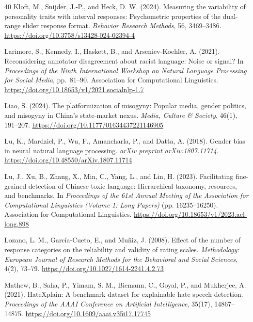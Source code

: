 \documentclass[a4paper,fleqn,review]{cas-sc}
\begin{document}
\begin{thebibliography}{40}
Kloft, M., Snijder, J.-P., and Heck, D. W. (2024).
Measuring the variability of personality traits with interval responses: Psychometric properties of the dual-range slider response format.
\emph{Behavior Research Methods}, 56, 3469--3486.
\url{https://doi.org/10.3758/s13428-024-02394-4}

Larimore, S., Kennedy, I., Haskett, B., and Arseniev-Koehler, A. (2021).
Reconsidering annotator disagreement about racist language: Noise or signal?
In \emph{Proceedings of the Ninth International Workshop on Natural Language Processing for Social Media}, pp.~81--90. Association for Computational Linguistics.
\url{https://doi.org/10.18653/v1/2021.socialnlp-1.7}

Liao, S. (2024).
The platformization of misogyny: Popular media, gender politics, and misogyny in China's state-market nexus.
\emph{Media, Culture \& Society}, 46(1), 191--207.
\url{https://doi.org/10.1177/01634437221146905}

Lu, K., Mardziel, P., Wu, F., Amancharla, P., and Datta, A. (2018).
Gender bias in neural natural language processing.
\emph{arXiv preprint arXiv:1807.11714}.
\url{https://doi.org/10.48550/arXiv.1807.11714}

Lu, J., Xu, B., Zhang, X., Min, C., Yang, L., and Lin, H. (2023).
Facilitating fine-grained detection of Chinese toxic language: Hierarchical taxonomy, resources, and benchmarks.
In \emph{Proceedings of the 61st Annual Meeting of the Association for Computational Linguistics (Volume 1: Long Papers)} (pp. 16235--16250).
Association for Computational Linguistics.
\url{https://doi.org/10.18653/v1/2023.acl-long.898}

Lozano, L. M., Garc\'ia-Cueto, E., and Mu\~niz, J. (2008).
Effect of the number of response categories on the reliability and validity of rating scales.
\emph{Methodology: European Journal of Research Methods for the Behavioral and Social Sciences}, 4(2), 73--79.
\url{https://doi.org/10.1027/1614-2241.4.2.73}

Mathew, B., Saha, P., Yimam, S. M., Biemann, C., Goyal, P., and Mukherjee, A. (2021).
HateXplain: A benchmark dataset for explainable hate speech detection.
\emph{Proceedings of the AAAI Conference on Artificial Intelligence}, 35(17), 14867--14875.
\url{https://doi.org/10.1609/aaai.v35i17.17745}


\end{thebibliography}
\end{document}
